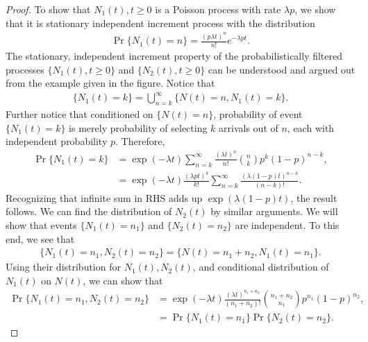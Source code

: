 \documentclass[a4paper,10pt,english]{article}
\begin{document}
\begin{proof} To show that ${N_{1}(t), t \geq 0}$ is a Poisson process with rate $\lambda p$, we show that it is stationary independent increment process with the distribution
\begin{align*}
 \Pr\{N_{1}(t)= n\}  = \frac{(p \lambda t)^{n}}{n!}e^{-\lambda p t}.
\end{align*}
The stationary, independent increment property of the probabilistically filtered processes $\{N_1(t), t \geqslant 0\}$ and $\{N_2(t), t \geqslant 0\}$ can be understood and argued out from the example given in the figure. Notice that 
\begin{align*}
	\{N_1(t)=k\} = \bigcup_{n=k}^\infty\{N(t) = n, N_1(t) = k\}.
\end{align*}
Further notice that conditioned on $\{N(t) = n\}$, probability of event $\{N_1(t) = k\}$ is merely probability of selecting $k$ arrivals out of $n$, each with independent probability $p$. Therefore, 
\begin{align*}
	\Pr\{N_1(t)=k\} &= \exp(-\lambda t)\sum_{n=k}^\infty\frac{(\lambda t)^n}{n!}\binom{n}{k}p^k(1-p)^{n-k},\\
	&= \exp(-\lambda t)\frac{(\lambda p t)^k}{k!}\sum_{n=k}^\infty\frac{(\lambda(1-p)t)^{n-k}}{(n-k)!}.%
\end{align*}
Recognizing that infinite sum in RHS adds up $\exp(\lambda(1-p)t)$, the result follows. We can find the distribution of $N_2(t)$ by similar arguments. We will show that events $\{N_1(t) = n_1\}$ and $\{N_2(t) = n_2\}$ are independent. To this end, we see that 
\begin{align*}
	\{N_1(t) = n_1, N_2(t) = n_2\} = \{N(t) = n_1 + n_2, N_1(t) = n_1\}.
\end{align*}
Using their distribution for $N_1(t), N_2(t)$, and conditional distribution of $N_1(t)$ on $N(t)$, we can show that
\begin{align*}
	\Pr\{N_1(t) = n_1, N_2(t) = n_2\} &= \exp(-\lambda t)\frac{(\lambda t)^{n_1 + n_2}}{(n_1 + n_2)!}\binom{n_1 + n_2}{n_1}p^{n_1}(1-p)^{n_2},\\
	&= \Pr\{N_1(t) = n_1\}\Pr\{N_2(t) = n_2\} .
\end{align*}



\end{proof}
\end{document}
